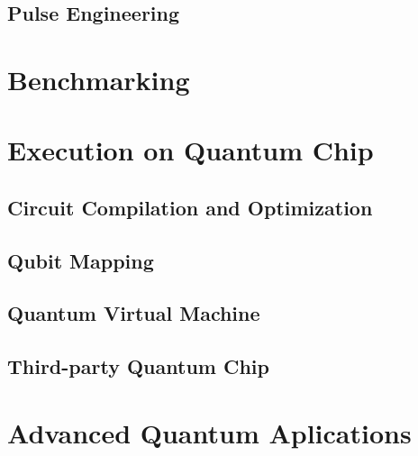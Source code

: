 \documentclass[pra,twocolumn,superscriptaddress,floatfix,nofootinbib,amsmath,amssymb]{revtex4-1}
\begin{document}
\subsection{Pulse Engineering}



\section{Benchmarking}



\section{Execution on Quantum Chip}

\subsection{Circuit Compilation and Optimization}


\subsection{Qubit Mapping}


\subsection{Quantum Virtual Machine}


\subsection{Third-party Quantum Chip}



\section{Advanced Quantum Aplications}



\end{document}
